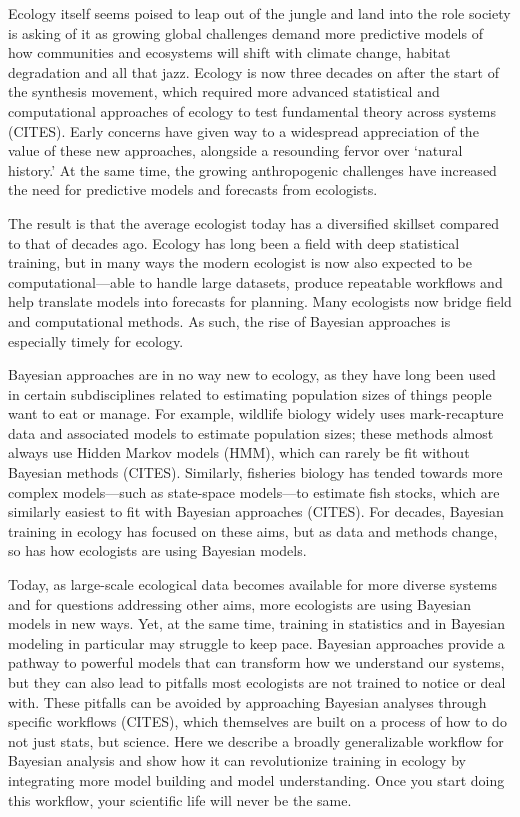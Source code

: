 \documentclass[11pt]{article}
\begin{document}
Ecology itself seems poised to leap out of the jungle and land into the role society is asking of it as growing global challenges demand more predictive models of how communities and ecosystems will shift with climate change, habitat degradation and all that jazz. Ecology is now three decades on after the start of the synthesis movement, which required more advanced statistical and computational approaches of ecology to test fundamental theory across systems (CITES). Early concerns have given way to a widespread appreciation of the value of these new approaches, alongside a resounding fervor over `natural history.' At the same time, the growing anthropogenic challenges have increased the need for predictive models and forecasts from ecologists. 

The result is that the average ecologist today has a diversified skillset compared to that of decades ago. Ecology has long been a field with deep statistical training, but in many ways the modern ecologist is now also expected to be computational---able to handle large datasets, produce repeatable workflows and help translate models into forecasts for planning. Many  ecologists now bridge field and computational methods. As such, the rise of Bayesian approaches is especially timely for ecology. %

Bayesian approaches are in no way new to ecology, as they have long been used in certain subdisciplines related to estimating population sizes of things people want to eat or manage. For example, wildlife biology widely uses mark-recapture data and associated models to estimate population sizes; these methods almost always use Hidden Markov models (HMM), which can rarely be fit without Bayesian methods (CITES). Similarly, fisheries biology has tended towards more complex models---such as state-space models---to estimate fish stocks, which are similarly easiest to fit with Bayesian approaches (CITES). For decades, Bayesian training in ecology has focused on these aims, but as data and methods change, so has how ecologists are using Bayesian models. 

Today, as large-scale ecological data becomes available for more diverse systems and for questions addressing other aims, more ecologists are using Bayesian models in new ways. Yet, at the same time, training in statistics and in Bayesian modeling in particular may struggle to keep pace. Bayesian approaches provide a pathway to powerful models that can transform how we understand our systems, but they can also lead to pitfalls most ecologists are not trained to notice or deal with. These pitfalls can be avoided by approaching Bayesian analyses through specific workflows (CITES), which themselves are built on a process of how to do not just stats, but science. Here we describe a broadly generalizable workflow for Bayesian analysis and show how it can revolutionize training in ecology by integrating more model building and model understanding. Once you start doing this workflow, your scientific life will never be the same. 
\end{document}

